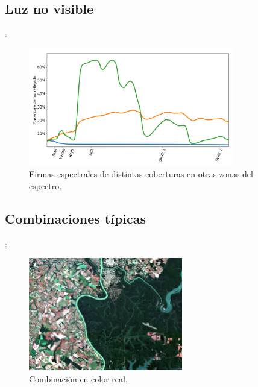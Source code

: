 \documentclass[handout,aspectratio=169]{beamer}
\begin{document}
\subsection{Luz no visible}

\begin{frame}{\secname : \subsecname}
    \begin{figure}[h!]
        \centering
        \includegraphics[width=0.8\textwidth]{fig:spec.png}
        \caption{Firmas espectrales de distintas coberturas en otras zonas del espectro.}
        \label{fig:spec}
    \end{figure}
\end{frame}

\subsection{Combinaciones típicas}

\begin{frame}{\secname : \subsecname}
    \begin{figure}[h!]
        \centering
        \includegraphics[width=0.6\textwidth]{4-3-2.jpeg}
        \caption{Combinación en color real.}
        \label{4-3-2}
    \end{figure}
\end{frame}
\end{document}
